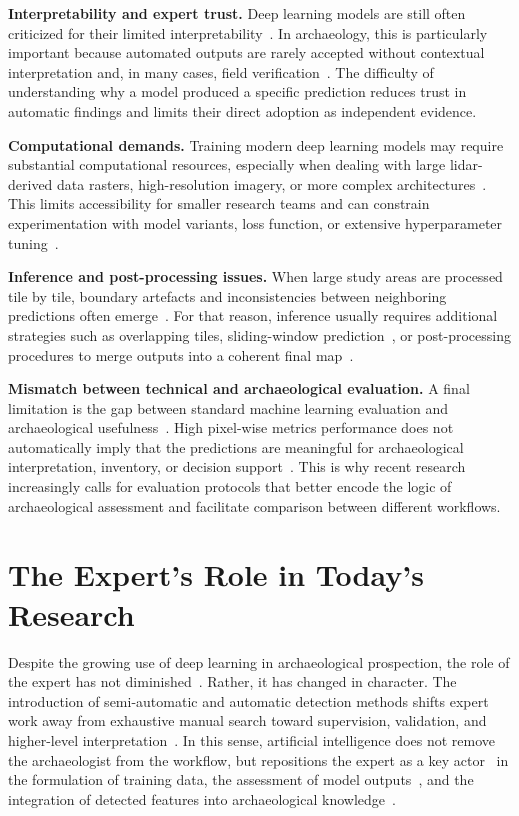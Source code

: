\textbf{Interpretability and expert trust.}
Deep learning models are still often criticized for their limited interpretability~\cite{azarkhordad_detecting_2025,bundzel_semantic_2020,}. In archaeology, this is particularly important because automated outputs are rarely accepted without contextual interpretation and, in many cases, field verification~\cite{fylaktos_deep_2025,guyot_objective_2021}. The difficulty of understanding why a model produced a specific prediction reduces trust in automatic findings and limits their direct adoption as independent evidence.

\textbf{Computational demands.}
Training modern deep learning models may require substantial computational resources, especially when dealing with large \gls{lidar}-derived data rasters, high-resolution imagery, or more complex architectures~\cite{fylaktos_deep_2025,zhang_semantic_2023}. This limits accessibility for smaller research teams and can constrain experimentation with model variants, loss function, or extensive hyperparameter tuning~\cite{fylaktos_deep_2025}.

\textbf{Inference and post-processing issues.}
When large study areas are processed tile by tile, boundary artefacts and inconsistencies between neighboring predictions often emerge~\cite{zhang_unveiling_2024}. For that reason, inference usually requires additional strategies such as overlapping tiles, sliding-window prediction~\cite{dietterich_ensemble_2000}, or post-processing procedures to merge outputs into a coherent final map~\cite{bundzel_semantic_2020,cui_semantic_2020}.

\textbf{Mismatch between technical and archaeological evaluation.}
A final limitation is the gap between standard machine learning evaluation and archaeological usefulness~\cite{fiorucci_deep_2022}. High pixel-wise metrics performance does not automatically imply that the predictions are meaningful for archaeological interpretation, inventory, or decision support~\cite{fiorucci_deep_2022,bundzel_semantic_2020}. This is why recent research increasingly calls for evaluation protocols that better encode the logic of archaeological assessment and facilitate comparison between different workflows.

\section{The Expert's Role in Today's Research}
Despite the growing use of deep learning in archaeological prospection, the role of the expert has not diminished~\cite{bundzel_semantic_2020,fylaktos_deep_2025}. Rather, it has changed in character. The introduction of semi-automatic and automatic detection methods shifts expert work away from exhaustive manual search toward supervision, validation, and higher-level interpretation~\cite{verschoof-van_der_vaart_combining_2020,bundzel_semantic_2020}. In this sense, artificial intelligence does not remove the archaeologist from the workflow, but repositions the expert as a key actor~\cite{zanzotto_viewpoint_2019} in the formulation of training data, the assessment of model outputs~\cite{settles_active_2009}, and the integration of detected features into archaeological knowledge~\cite{bundzel_semantic_2020,fiorucci_deep_2022}.

